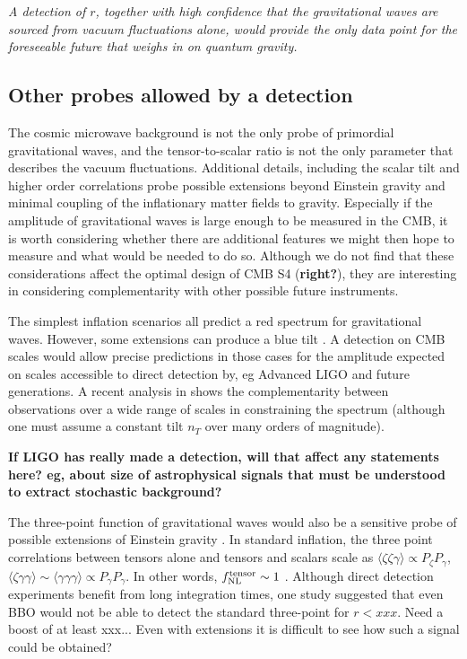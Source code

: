 {\it A detection of $r$, together with high confidence that the gravitational waves are sourced from vacuum fluctuations alone, would provide the only data point for the foreseeable future that weighs in on quantum gravity.}

\subsection{Other probes allowed by a detection}
The cosmic microwave background is not the only probe of primordial gravitational waves, and the tensor-to-scalar ratio is not the only parameter that describes the vacuum fluctuations. Additional details, including the scalar tilt and higher order correlations probe possible extensions beyond Einstein gravity and minimal coupling of the inflationary matter fields to gravity. Especially if the amplitude of gravitational waves is large enough to be measured in the CMB, it is worth considering whether there are additional features we might then hope to measure and what would be needed to do so. Although we do not find that these considerations affect the optimal design of CMB S4 ({\bf right?}), they are interesting in considering complementarity with other possible future instruments.

The simplest inflation scenarios all predict a red spectrum for gravitational waves. However, some extensions can produce a blue tilt \cite{}. A detection on CMB scales would allow precise predictions in those cases for the amplitude expected on scales accessible to direct detection by, eg Advanced LIGO and future generations.  A recent analysis in \cite{Lasky:2015lej} shows the complementarity between observations over a wide range of scales in constraining the spectrum (although one must assume a constant tilt $n_T$ over many orders of magnitude).

{\bf If LIGO has really made a detection, will that affect any statements here? eg, about size of astrophysical signals that must be understood to extract stochastic background?}

The three-point function of gravitational waves would also be a sensitive probe of possible extensions of Einstein gravity \cite{}. In standard inflation, the three point correlations between tensors alone and tensors and scalars scale as $\langle\zeta\zeta\gamma\rangle\propto P_{\zeta}P_{\gamma}$, $\langle\zeta\gamma\gamma\rangle\sim\langle\gamma\gamma\gamma\rangle\propto P_{\gamma}P_{\gamma}$. In other words, $f^{\rm tensor}_{\rm NL}\sim 1$ \cite{}. Although direct detection experiments benefit from long integration times, one study suggested that even BBO would not be able to detect the standard three-point \cite{Adshead:2009bz} for $r<xxx$. Need a boost of at least xxx... Even with extensions it is difficult to see how such a signal could be obtained?

